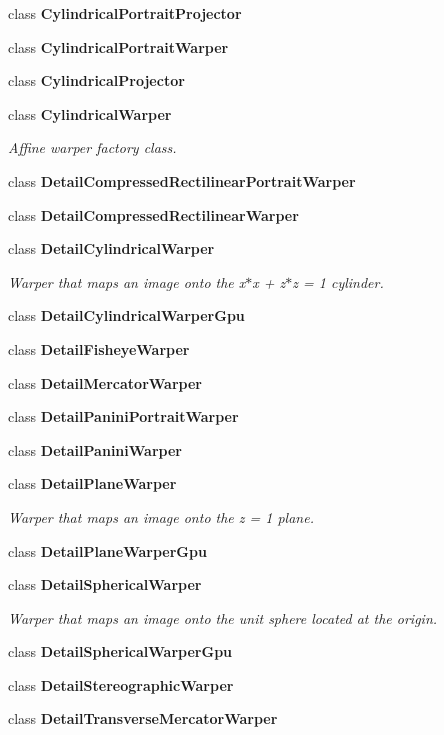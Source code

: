 \begin{DoxyCompactItemize}
class {\bfseries Cylindrical\+Portrait\+Projector}
\item 
class {\bfseries Cylindrical\+Portrait\+Warper}
\item 
class {\bfseries Cylindrical\+Projector}
\item 
class {\bfseries Cylindrical\+Warper}
\begin{DoxyCompactList}\small\item\em Affine warper factory class. \end{DoxyCompactList}\item 
class {\bfseries Detail\+Compressed\+Rectilinear\+Portrait\+Warper}
\item 
class {\bfseries Detail\+Compressed\+Rectilinear\+Warper}
\item 
class {\bfseries Detail\+Cylindrical\+Warper}
\begin{DoxyCompactList}\small\item\em Warper that maps an image onto the x$\ast$x + z$\ast$z = 1 cylinder. \end{DoxyCompactList}\item 
class {\bfseries Detail\+Cylindrical\+Warper\+Gpu}
\item 
class {\bfseries Detail\+Fisheye\+Warper}
\item 
class {\bfseries Detail\+Mercator\+Warper}
\item 
class {\bfseries Detail\+Panini\+Portrait\+Warper}
\item 
class {\bfseries Detail\+Panini\+Warper}
\item 
class {\bfseries Detail\+Plane\+Warper}
\begin{DoxyCompactList}\small\item\em Warper that maps an image onto the z = 1 plane. \end{DoxyCompactList}\item 
class {\bfseries Detail\+Plane\+Warper\+Gpu}
\item 
class {\bfseries Detail\+Spherical\+Warper}
\begin{DoxyCompactList}\small\item\em Warper that maps an image onto the unit sphere located at the origin. \end{DoxyCompactList}\item 
class {\bfseries Detail\+Spherical\+Warper\+Gpu}
\item 
class {\bfseries Detail\+Stereographic\+Warper}
\item 
class {\bfseries Detail\+Transverse\+Mercator\+Warper}
\item 

\end{DoxyCompactItemize}
